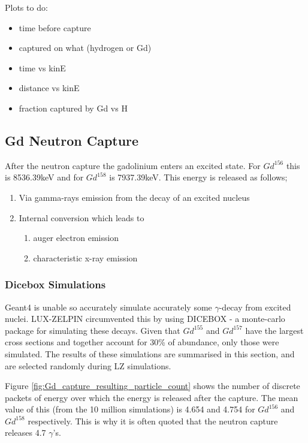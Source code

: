 \par
Plots to do:

\begin{itemize}
    \item time before capture
    \item captured on what (hydrogen or Gd)
    \item time vs kinE
    \item distance vs kinE
    \item fraction captured by Gd vs H
\end{itemize}


\subsection{Gd Neutron Capture}
\par
After the neutron capture the gadolinium enters an excited state. 
For $Gd^{156}$ this is 8536.39keV and for $Gd^{158}$ is 7937.39keV.
This energy is released as follows;

\begin{enumerate}
    \item Via gamma-rays emission from the decay of an excited nucleus
    \item Internal conversion which leads to
    \begin{enumerate}
        \item auger electron emission
        \item characteristic x-ray emission
    \end{enumerate}
\end{enumerate}


\subsubsection{Dicebox Simulations}
\par
Geant4 is unable so accurately simulate accurately some $\gamma$-decay from excited nuclei.
LUX-ZELPIN circumvented this by using DICEBOX - a monte-carlo package for simulating these decays.
Given that $Gd^{155}$ and $Gd^{157}$ have the largest cross sections and together account for 30\% of abundance, only those were simulated.
The results of these simulations are summarised in this section, and are selected randomly during LZ simulations.

\par
Figure \ref{fig:Gd_capture_resulting_particle_count} shows the number of discrete packets of energy over which the energy is released after the capture.
The mean value of this (from the 10 million simulations) is 4.654 and 4.754 for $Gd^{156}$ and $Gd^{158}$ respectively.
This is why it is often quoted that the neutron capture releases 4.7 $\gamma$'s.

